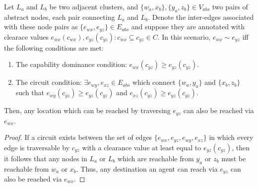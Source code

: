 \begin{theorem}
\label{aha-theorem:weakdominance}
Let $L_{a}$ and $L_{b}$ be two adjacent clusters, and $\lbrace w_{a}, x_{b} \rbrace, \lbrace y_{a}, z_{b} \rbrace \in V_{abs}$ two pairs of abstract nodes, each pair connecting $L_{a}$ and $L_{b}$.
Denote the inter-edges associated with these node pairs as $\lbrace e_{wx}, e_{yz} \rbrace \in E_{abs}$ and suppose they are annotated with clearace values $e_{wx}(c_{wx}), e_{yz}(c_{yz}) : c_{wx} \subseteq c_{yz} \in C$.
 In this scenario, $e_{wx} \sim e_{yz}$ iff the following conditions are met:
\begin{enumerate}
\item{The capability dominance condition: $e_{wx}(c_{yz}) \geq e_{yz}(c_{yz})$}.
\item{The circuit condition: $\exists e_{wy}, e_{xz} \in E_{abs}$ which connect $\lbrace w_{a}, y_{a} \rbrace$ and $\lbrace x_{b}, z_{b} \rbrace$ such that $e_{wy}(c_{yz}) \geq e_{yz}(c_{yz})$ and $e_{xz}(c_{yz}) \geq e_{yz}(c_{yz})$.}
\end{enumerate}
Then, any location which can be reached by traversing $e_{yz}$ can also be reached via $e_{wx}$.
\end{theorem}

\begin{proof}
If a circuit exists between the set of edges $\lbrace e_{wx}, e_{yz}, e_{wy}, e_{xz} \rbrace$ in which every edge is traversable by $c_{yz}$ with a clearance value at least equal to $e_{yz}(c_{yz})$, then it follows that any nodes in $L_{a}$ or $L_{b}$ which are reachable from $y_{a}$ or $z_{b}$ must be reachable from $w_{a}$ or $x_{b}$.
Thus, any destination an agent can reach via $e_{yz}$ can also be reached via $e_{wx}$. 
\end{proof}

